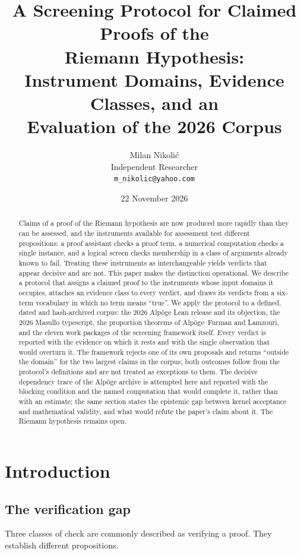 \documentclass[11pt,a4paper]{article}
\title{\bfseries A Screening Protocol for Claimed Proofs of the\\ Riemann Hypothesis:\\[2pt]
Instrument Domains, Evidence Classes, and an\\ Evaluation of the 2026 Corpus}
\author{Milan Nikoli\'c\\[2pt]
\small Independent Researcher\\
\small \texttt{m\_nikolic@yahoo.com}}
\date{22 November 2026}
\begin{document}
\maketitle

\begin{abstract}
\noindent
Claims of a proof of the Riemann hypothesis are now produced more rapidly than they can be
assessed, and the instruments available for assessment test different propositions: a proof
assistant checks a proof term, a numerical computation checks a single instance, and a logical
screen checks membership in a class of arguments already known to fail. Treating these
instruments as interchangeable yields verdicts that appear decisive and are not. This paper
makes the distinction operational. We describe a protocol that assigns a claimed proof to the
instruments whose input domains it occupies, attaches an evidence class to every verdict, and
draws its verdicts from a six-term vocabulary in which no term means ``true''. We apply the
protocol to a defined, dated and hash-archived corpus: the 2026 Alp\"oge Lean release and its
objection, the 2026 Masullo typescript, the proportion theorems of Alp\"oge--Furman and
Lamzouri, and the eleven work packages of the screening framework itself. Every verdict is
reported with the evidence on which it rests and with the single observation that would
overturn it. The framework rejects one of its own proposals and returns ``outside the domain''
for the two largest claims in the corpus; both outcomes follow from the protocol's definitions
and are not treated as exceptions to them. The decisive dependency trace of the Alp\"oge archive is
attempted here and reported with the blocking condition and the named computation that would
complete it, rather than with an estimate; the same section states the epistemic gap between kernel
acceptance and mathematical validity, and what would refute the paper's claim about it. The Riemann
hypothesis remains open.
\end{abstract}

\tableofcontents

\section{Introduction}

\subsection{The verification gap}

Three classes of check are commonly described as verifying a proof. They establish
different propositions.
\end{document}
